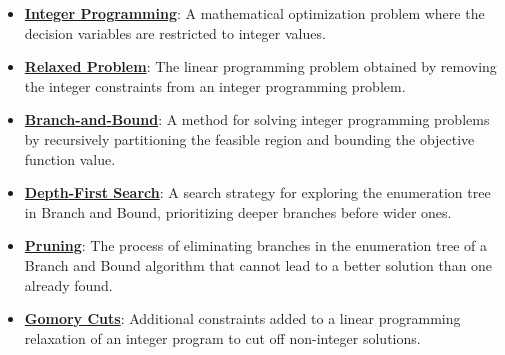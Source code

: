 \documentclass{article}%
\begin{document}
\begin{itemize}[leftmargin=*]%
\item \href{https://www.math.purdue.edu/~yipn/421/2024-10-31-IntLinProg.pdf#page=1}{\textbf{Integer Programming}}: A mathematical optimization problem where the decision variables are restricted to integer values.%
\item \href{https://www.math.purdue.edu/~yipn/421/2024-10-31-IntLinProg.pdf#page=2}{\textbf{Relaxed Problem}}: The linear programming problem obtained by removing the integer constraints from an integer programming problem.%
\item \href{https://www.math.purdue.edu/~yipn/421/2024-10-31-IntLinProg.pdf#page=5}{\textbf{Branch{-}and{-}Bound}}: A method for solving integer programming problems by recursively partitioning the feasible region and bounding the objective function value.%
\item \href{https://www.math.purdue.edu/~yipn/421/2024-10-31-IntLinProg.pdf#page=11}{\textbf{Depth{-}First Search}}: A search strategy for exploring the enumeration tree in Branch and Bound, prioritizing deeper branches before wider ones.%
\item \href{https://www.math.purdue.edu/~yipn/421/2024-10-31-IntLinProg.pdf#page=11}{\textbf{Pruning}}: The process of eliminating branches in the enumeration tree of a Branch and Bound algorithm that cannot lead to a better solution than one already found.%
\item \href{https://www.math.purdue.edu/~yipn/421/2024-10-31-IntLinProg.pdf#page=15}{\textbf{Gomory Cuts}}: Additional constraints added to a linear programming relaxation of an integer program to cut off non-integer solutions.%
\end{itemize}%
\end{document}
